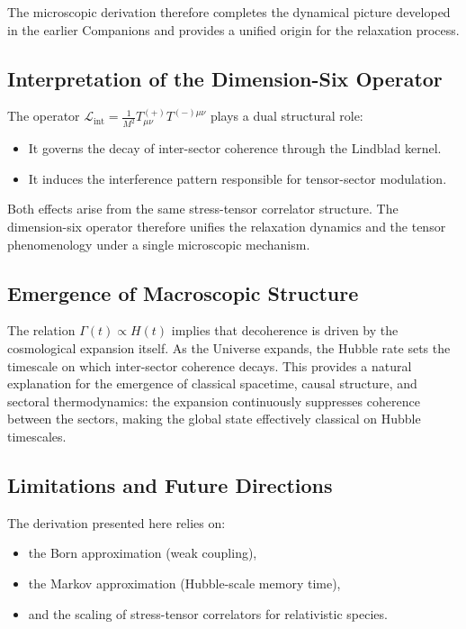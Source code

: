 \documentclass[11pt,a4paper]{article}
\newcommand{\LintDef}{\mathcal{L}_{\mathrm{int}} = \frac{1}{M^2} T^{(+)}_{\mu\nu} T^{(-)\mu\nu}}
\begin{document}
The microscopic derivation therefore completes the dynamical picture developed
in the earlier Companions and provides a unified origin for the relaxation
process.

\subsection{Interpretation of the Dimension-Six Operator}

The operator \(\LintDef\) plays a dual structural role:

\begin{itemize}
    \item It governs the decay of inter-sector coherence through the Lindblad
          kernel.
    \item It induces the interference pattern responsible for tensor-sector
          modulation.
\end{itemize}

Both effects arise from the same stress-tensor correlator structure. The
dimension-six operator therefore unifies the relaxation dynamics and the tensor
phenomenology under a single microscopic mechanism.

\subsection{Emergence of Macroscopic Structure}

The relation \(\Gamma(t) \propto H(t)\) implies that decoherence is driven by the
cosmological expansion itself. As the Universe expands, the Hubble rate sets the
timescale on which inter-sector coherence decays. This provides a natural
explanation for the emergence of classical spacetime, causal structure, and
sectoral thermodynamics: the expansion continuously suppresses coherence between
the sectors, making the global state effectively classical on Hubble timescales.

\subsection{Limitations and Future Directions}

The derivation presented here relies on:

\begin{itemize}
    \item the Born approximation (weak coupling),
    \item the Markov approximation (Hubble-scale memory time),
    \item and the scaling of stress-tensor correlators for relativistic species.
\end{itemize}
\end{document}
